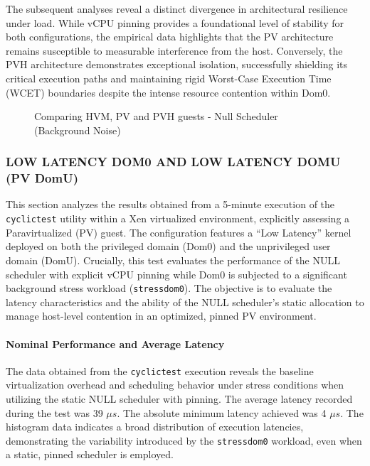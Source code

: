 The subsequent analyses reveal a distinct divergence in architectural
resilience under load. While vCPU pinning provides a foundational level
of stability for both configurations, the empirical data highlights that
the PV architecture remains susceptible to measurable interference from
the host. Conversely, the PVH architecture demonstrates exceptional
isolation, successfully shielding its critical execution paths and
maintaining rigid Worst-Case Execution Time (WCET) boundaries despite
the intense resource contention within Dom0.

\begin{figure}
\centering

\caption{Comparing HVM, PV and PVH guests - Null Scheduler (Background
Noise)}
\end{figure}

\subsubsection{LOW LATENCY DOM0 AND LOW LATENCY DOMU (PV
DomU)}\label{low-latency-dom0-and-low-latency-domu-pv-domu-3}

This section analyzes the results obtained from a 5-minute execution of
the \texttt{cyclictest} utility within a Xen virtualized environment,
explicitly assessing a Paravirtualized (PV) guest. The configuration
features a ``Low Latency'' kernel deployed on both the privileged domain
(Dom0) and the unprivileged user domain (DomU). Crucially, this test
evaluates the performance of the NULL scheduler with explicit vCPU
pinning while Dom0 is subjected to a significant background stress
workload (\texttt{stressdom0}). The objective is to evaluate the latency
characteristics and the ability of the NULL scheduler's static
allocation to manage host-level contention in an optimized, pinned PV
environment.

\paragraph{Nominal Performance and Average
Latency}\label{nominal-performance-and-average-latency-29}

The data obtained from the \texttt{cyclictest} execution reveals the
baseline virtualization overhead and scheduling behavior under stress
conditions when utilizing the static NULL scheduler with pinning. The
average latency recorded during the test was 39 $\mu s$. The absolute minimum
latency achieved was 4 $\mu s$. The histogram data indicates a broad
distribution of execution latencies, demonstrating the variability
introduced by the \texttt{stressdom0} workload, even when a static,
pinned scheduler is employed.

